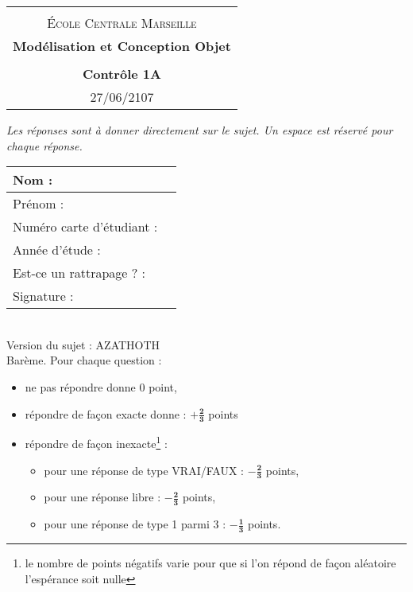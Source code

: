 \documentclass[12pt]{article}
\begin{document}
\begin{center}
  \begin{tabular}{c}
  \hline\\%
  {\textsc{\'Ecole Centrale Marseille}}\vspace{0.1cm}
  \\
%  
    {\bf {\Large Modélisation et Conception Objet}}\\%
    \\
    {\bf  { Contrôle 1A }}\\
    {\footnotesize 27/06/2107}\\
    \hline
  \end{tabular}
\end{center}
\vspace{0.6cm}

\noindent
{\em Les réponses sont à donner directement sur le sujet. Un espace est réservé pour chaque réponse.}

\vspace*{1cm}
\noindent
\begin{tabular}{|l|p{10cm}|}
    \hline
    Nom : & \\
    \hline
    Prénom : & \\
\hline
    Numéro carte d'étudiant : & \\
    \hline
    Année d'étude :& \\    
    \hline
    Est-ce un rattrapage ? :& \\    
    \hline
    Signature : & \vspace*{2cm}\\
    \hline
    
\end{tabular}


\noindent
\\
Version du sujet : {\small AZATHOTH}\\


\vspace*{2cm}
\noindent
Barème. Pour chaque question : 
\begin{itemize}
    \item ne pas répondre donne 0 point,
    \item répondre de façon exacte donne : $\mathbf{+\frac{2}{3}}$ points
    \item répondre de façon inexacte\footnote{le nombre de points négatifs varie pour que si l'on répond de façon aléatoire l'espérance soit nulle} : 
    \begin{itemize}
        \item pour une réponse de type VRAI/FAUX : $\mathbf{-\frac{2}{3}}$ points,
        \item pour une réponse libre : $\mathbf{-\frac{2}{3}}$ points,
        \item pour une réponse de type 1 parmi 3 : $\mathbf{-\frac{1}{3}}$ points.
    \end{itemize}
\end{itemize}
\end{document}
